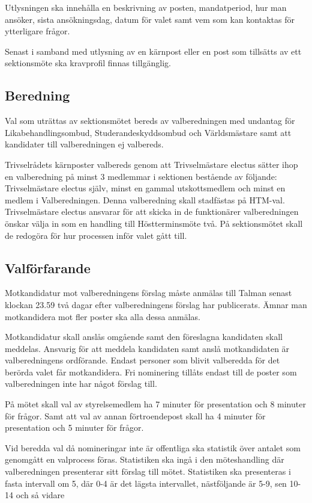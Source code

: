\documentclass{dsekprotokoll}
\begin{document}
Utlysningen ska innehålla en beskrivning av posten, mandatperiod, hur man ansöker, sista  ansökningsdag, datum för valet samt vem som kan kontaktas för ytterligare frågor.

Senast i samband med utlysning av en kärnpost eller en post som tillsätts av ett sektionsmöte ska kravprofil finnas tillgänglig.

\subsection{Beredning}
Val som uträttas av sektionsmötet bereds av valberedningen med undantag för Likabehandlingsombud, Studerandeskyddsombud och Världsmästare samt att kandidater till valberedningen ej valbereds.

Trivselrådets kärnposter valbereds genom att Trivselmästare electus sätter ihop en valberedning på minst 3 medlemmar i sektionen bestående av följande: Trivselmästare electus själv, minst en gammal utskottsmedlem och minst en medlem i Valberedningen. Denna valberedning skall stadfästas på HTM-val. Trivselmästare electus ansvarar för att skicka in de funktionärer valberedningen önskar välja in som en handling till Höstterminsmöte två. På sektionsmötet skall de redogöra för hur processen inför valet gått till.

\subsection{Valförfarande}
Motkandidatur mot valberedningens förslag måste anmälas till Talman senast klockan 23.59 två dagar efter valberedningens förslag har publicerats. Ämnar man motkandidera mot fler poster ska alla dessa anmälas.

Motkandidatur skall anslås omgående samt den föreslagna kandidaten skall meddelas. Ansvarig för att meddela kandidaten samt anslå motkandidaten är valberedningens ordförande. Endast personer som blivit valberedda för det berörda valet får motkandidera.
Fri nominering tillåts endast till de poster som valberedningen inte har något förslag till.

På mötet skall val av styrelsemedlem ha 7 minuter för presentation och 8 minuter för frågor. Samt att val av annan förtroendepost skall ha 4 minuter för presentation och 5 minuter för frågor.

Vid beredda val då nomineringar inte är offentliga ska statistik över antalet som genomgått en valprocess föras. Statistiken ska ingå i den möteshandling där valberedningen presenterar sitt förslag till mötet. Statistiken ska presenteras i fasta intervall om 5, där 0-4
är det lägsta intervallet, nästföljande är 5-9, sen 10-14 och så
vidare
\end{document}
